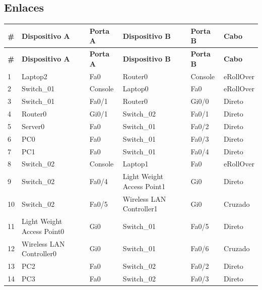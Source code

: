\subsection{Enlaces}
\begingroup\scriptsize\setlength{\tabcolsep}{3pt}
\begin{longtable}{@{}p{}p{}p{}p{}p{}p{}@{}}
\toprule \textbf{\#} & \textbf{Dispositivo A} & \textbf{Porta A} & \textbf{Dispositivo B} & \textbf{Porta B} & \textbf{Cabo} \\\midrule\endfirsthead
\toprule \textbf{\#} & \textbf{Dispositivo A} & \textbf{Porta A} & \textbf{Dispositivo B} & \textbf{Porta B} & \textbf{Cabo} \\\midrule\endhead
1 & Laptop2 & Fa0 & Router0 & Console & eRollOver \\
2 & Switch\_01 & Console & Laptop0 & Fa0 & eRollOver \\
3 & Switch\_01 & Fa0/1 & Router0 & Gi0/0 & Direto \\
4 & Router0 & Gi0/1 & Switch\_02 & Fa0/1 & Direto \\
5 & Server0 & Fa0 & Switch\_01 & Fa0/2 & Direto \\
6 & PC0 & Fa0 & Switch\_01 & Fa0/3 & Direto \\
7 & PC1 & Fa0 & Switch\_01 & Fa0/4 & Direto \\
8 & Switch\_02 & Console & Laptop1 & Fa0 & eRollOver \\
9 & Switch\_02 & Fa0/4 & Light Weight Access Point1 & Gi0 & Direto \\
10 & Switch\_02 & Fa0/5 & Wireless LAN Controller1 & Gi0 & Cruzado \\
11 & Light Weight Access Point0 & Gi0 & Switch\_01 & Fa0/5 & Direto \\
12 & Wireless LAN Controller0 & Gi0 & Switch\_01 & Fa0/6 & Cruzado \\
13 & PC2 & Fa0 & Switch\_02 & Fa0/2 & Direto \\
14 & PC3 & Fa0 & Switch\_02 & Fa0/3 & Direto \\
\bottomrule
\end{longtable}\endgroup

